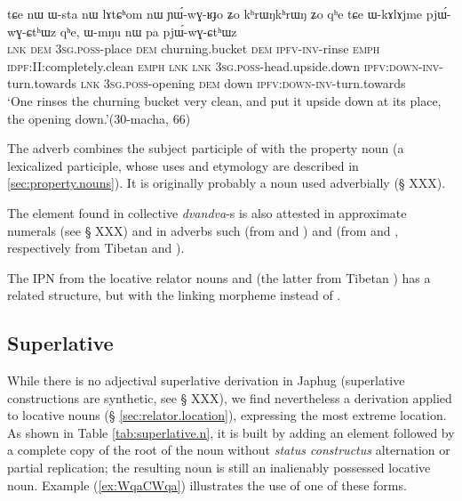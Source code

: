 \begin{exe}
\ex \label{ex:WkAlAjme}
 \gll tɕe nɯ ɯ-sta nɯ lɤtɕʰom nɯ ɲɯ́-wɣ-ʁɟo ʑo kʰrɯŋkʰrɯŋ ʑo qʰe tɕe ɯ-kɤlɤjme pjɯ́-wɣ-ɕtʰɯz qʰe, ɯ-mŋu nɯ pa pjɯ́-wɣ-ɕtʰɯz \\
 \textsc{lnk} \textsc{dem} \textsc{3sg.poss}-place \textsc{dem} churning.bucket \textsc{dem} \textsc{ipfv}-\textsc{inv}-rinse \textsc{emph}  \textsc{idpf}:II:completely.clean \textsc{emph} \textsc{lnk} \textsc{lnk} \textsc{3sg.poss}-head.upside.down \textsc{ipfv}:\textsc{down}-\textsc{inv}-turn.towards \textsc{lnk} \textsc{3sg.poss}-opening \textsc{dem} down   \textsc{ipfv}:\textsc{down}-\textsc{inv}-turn.towards \\
 \glt `One rinses the churning bucket very clean, and put it upside down at its place, the opening down.'(30-macha, 66)
\end{exe}

The adverb  combines the subject participle of  with the property noun  (a lexicalized participle, whose uses and etymology are described in \ref{sec:property.nouns}). It is originally probably a noun used adverbially (§ XXX).


The   element found in collective \textit{dvandva}-s is also attested in approximate numerals (see § XXX) and in adverbs such  (from  and ) and   (from  and , respectively from Tibetan  and ).
 
 
The IPN  from the locative relator nouns  and  (the latter from Tibetan ) has a related structure, but with the linking morpheme  instead of .

\subsection{Superlative} \label{sec:superlative.XCWX}
While there is no adjectival superlative derivation in Japhug (superlative constructions are synthetic, see § XXX), we find nevertheless a derivation applied to locative nouns (§ \ref{sec:relator.location}), expressing the most extreme location. As shown in Table \ref{tab:superlative.n}, it is built by adding an element  followed by a complete copy of the root of the noun without \textit{status constructus} alternation or partial replication; the resulting noun is still an inalienably possessed locative noun. Example (\ref{ex:WqaCWqa}) illustrates the use of one of these forms.


